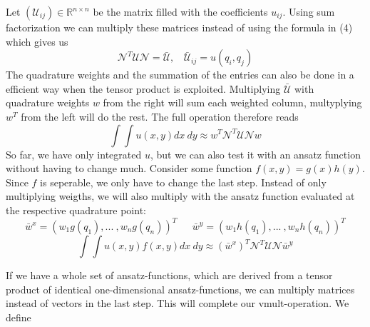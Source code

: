 \documentclass[a4paper,12pt]{report}
\begin{document}
Let $(\mathcal{U}_{ij}) \in \mathbb{R}^{n \times n}$ be the matrix filled with the coefficients $u_{ij}$. Using sum factorization we can multiply these matrices instead of using the formula in (4) which gives us
\begin{equation}
\mathcal{N}^T \mathcal{U} \mathcal{N} = \bar{\mathcal{U}}, \ \ \ \ \bar{\mathcal{U}}_{ij} = u(q_i,q_j)
\end{equation}
The quadrature weights and the summation of the entries can also be done in a efficient way when the tensor product is exploited. Multiplying $\bar{\mathcal{U}}$ with quadrature weights $w$ from the right will sum each weighted column, multyplying $w^T$ from the left will do the rest. The full operation therefore reads
\begin{equation}
\int \int u(x,y) dx \ dy \approx w^T \mathcal{N}^T \mathcal{U} \mathcal{N} w
\end{equation} 
So far, we have only integrated $u$, but we can also test it with an ansatz function without having to change much. Consider some function $f(x,y)=g(x)h(y)$. Since $f$ is seperable, we only have to change the last step. Instead of only multiplying weigths, we will also multiply with the ansatz function evaluated at the respective quadrature point: 
\[\bar{w}^x=(w_1 g(q_1), ... \ ,w_n g(q_n))^T \ \ \ \ \ \ \ \bar{w}^y=(w_1 h(q_1), ... \ ,w_n h(q_n))^T\]
\begin{equation}
\int \int u(x,y) f(x,y) dx \ dy \approx (\bar{w}^x)^T \mathcal{N}^T \mathcal{U} \mathcal{N} \bar{w}^y
\end{equation}

If we have a whole set of ansatz-functions, which are derived from a tensor product of identical one-dimensional ansatz-functions, we can multiply matrices instead of vectors in the last step. This will complete our vmult-operation. We define
\end{document}
